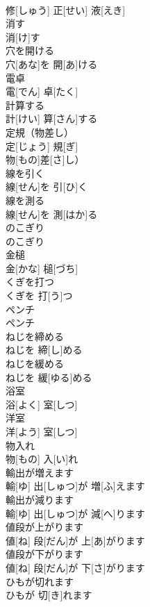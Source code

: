 \documentclass[8pt]{extreport}
\begin{document}
\begin{CJK}{UTF8}{min}
\\	修[しゅう] 正[せい] 液[えき]		
\\	消す	
\\	消[け]す		
\\	穴を開ける	
\\	穴[あな]を 開[あ]ける		
\\	電卓	
\\	電[でん] 卓[たく]		
\\	計算する	
\\	計[けい] 算[さん]する		
\\	定規（物差し）	
\\	定[じょう] 規[ぎ]
\\	物[もの]差[さ]し）		
\\	線を引く	
\\	線[せん]を 引[ひ]く		
\\	線を測る	
\\	線[せん]を 測[はか]る		
\\	のこぎり	
\\	のこぎり		
\\	金槌	
\\	金[かな] 槌[づち]		
\\	くぎを打つ	
\\	くぎを 打[う]つ		
\\	ペンチ	
\\	ペンチ		
\\	ねじを締める	
\\	ねじを 締[し]める		
\\	ねじを緩める	
\\	ねじを 緩[ゆる]める		
\\	浴室	
\\	浴[よく] 室[しつ]		
\\	洋室	
\\	洋[よう] 室[しつ]		
\\	物入れ	
\\	物[もの] 入[い]れ		
\\	輸出が増えます	
\\	輸[ゆ] 出[しゅつ]が 増[ふ]えます		
\\	輸出が減ります	
\\	輸[ゆ] 出[しゅつ]が 減[へ]ります		
\\	値段が上がります	
\\	値[ね] 段[だん]が 上[あ]がります		
\\	値段が下がります	
\\	値[ね] 段[だん]が 下[さ]がります		
\\	ひもが切れます	
\\	ひもが 切[き]れます		

\end{CJK}
\end{document}
